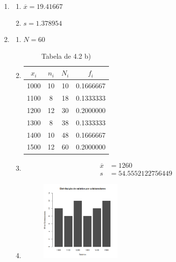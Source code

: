 \documentclass[11pt,a4paper]{article}
\begin{document}
\begin{enumerate}[label=\arabic{section}.\arabic*]
	\item {}
		\begin{enumerate}[label=\alph*)]
		\item $\overline{x} = 19.41667$\hfill
			
		\item $s = 1.378954$\hfill
			
		\end{enumerate}
	\item {}\hfill
		\begin{enumerate}[label=\alph*)]
		\item $N = 60$\hfill
			
		\item \hfill
			\begin{table}[h!]
				\centering
				\begin{tabular}{|c|c|c|c|}
					\hline
					$x_i$&$n_i$&$N_i$&$f_i$ \\
					\hline
					1000&10&10&0.1666667\\
					\hline
					1100& 8&18&0.1333333\\
					\hline
					1200&12&30&0.2000000\\
					\hline
					1300& 8&38&0.1333333\\
					\hline
					1400&10&48&0.1666667\\
					\hline
					1500&12&60&0.2000000\\
					\hline
				\end{tabular}
				\caption{Tabela de 4.2 b)}
			\end{table}
			
		\item \hfill
			\begin{align*}
				\overline{x} &= 1260 \\
				s &= 54.5552122756449
			\end{align*}
			
			\clearpage
		\item \hfill
			\begin{figure}[h!]
				\centering
				\includegraphics[width=0.4\textwidth]{./recursos/ex4_2d.png}

\end{figure}
\end{enumerate}
\end{enumerate}
\end{document}

